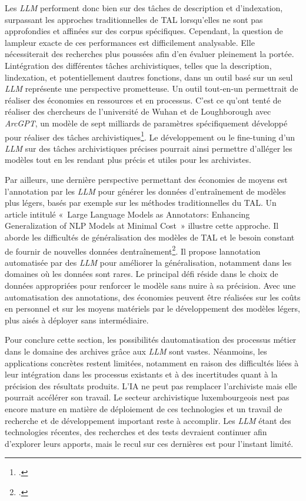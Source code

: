 	Les \emph{LLM} performent donc bien sur des tâches de description et
	d'indexation, surpassant les approches traditionnelles de \gls{TAL} lorsqu'elles ne sont pas approfondies et affinées sur des corpus spécifiques. Cependant, la question
	de l\textquotesingle ampleur exacte de ces performances est
	difficilement analysable. Elle nécessiterait des recherches plus
	poussées afin d'en évaluer pleinement la portée.
	L\textquotesingle intégration des différentes tâches archivistiques,
	telles que la description, l\textquotesingle indexation, et
	potentiellement d\textquotesingle autres fonctions, dans un outil basé
	sur un seul \emph{LLM} représente une perspective prometteuse. Un outil
	tout-en-un permettrait de réaliser des économies en ressources et en
	processus. C'est ce qu'ont tenté de réaliser des chercheurs de
	l'université de Wuhan et de Loughborough avec \emph{ArcGPT}, un modèle
	de sept milliards de paramètres spécifiquement développé pour réaliser des
	tâches archivistiques\footcite{zhang_arcgpt_2023}.
	Le développement ou le \gls{fine-tuning} d'un \emph{LLM} sur des tâches archivistiques
	précises pourrait ainsi permettre d'alléger les modèles tout en les rendant
	plus précis et utiles pour les archivistes.
	
	Par ailleurs, une dernière perspective permettant des économies de
	moyens est l'annotation par les \emph{LLM} pour générer les données d'entraînement de
	modèles plus légers, basés par exemple sur les méthodes traditionnelles
	du \gls{TAL}. Un article intitulé «~Large Language Models as Annotators:
	Enhancing Generalization of NLP Models at Minimal Cost~» illustre cette
	approche. Il aborde les difficultés de généralisation des modèles de
	\gls{TAL} et le besoin constant de fournir de nouvelles données
	d\textquotesingle entraînement\footcite{llm_ann}. Il propose
	l\textquotesingle annotation automatisée par des \emph{LLM} pour améliorer la
	généralisation, notamment dans les domaines où les données sont rares.
	Le principal défi réside dans le choix de données appropriées pour
	renforcer le modèle sans nuire à sa précision. Avec une automatisation
	des annotations, des économies peuvent être réalisées sur les coûts en
	personnel et sur les moyens matériels par le
	développement des modèles légers, plus aisés à déployer sans
	intermédiaire.
	\linebreak
	
	Pour conclure cette section, les possibilités
	d\textquotesingle automatisation des processus métier dans le domaine
	des archives grâce aux \emph{LLM} sont vastes. Néanmoins, les applications
	concrètes restent limitées, notamment en raison des difficultés liées à
	leur intégration dans les processus existants et à des incertitudes quant
	à la précision des résultats produits. L'IA ne peut pas remplacer l'archiviste mais
	elle pourrait accélérer son travail. Le secteur archivistique luxembourgeois
	n\textquotesingle est pas encore mature en matière de déploiement de ces
	technologies et un travail de recherche et de développement important
	reste à accomplir. Les \emph{LLM} étant des technologies récentes, des
	recherches et des tests devraient continuer afin d'explorer leurs
	apports, mais le recul sur ces dernières est pour l'instant limité.
	

